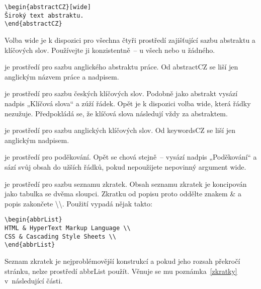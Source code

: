 \documentclass[FM,BP]{tulthesis}
\newcommand{\argument}[1]{{\ttfamily\color{\tulcolor}#1}}
\newcommand{\argumentindex}[1]{\argument{#1}\index{#1}}
\newcommand{\prostredi}[1]{\argumentindex{#1}}
\newenvironment{myquote}{\begin{list}{}{\setlength\leftmargin\parindent}\item[]}{\end{list}}
\newenvironment{listing}{\begin{myquote}\color{\tulcolor}}{\end{myquote}}
\begin{document}
\begin{description}
\begin{listing}
\begin{verbatim}
\begin{abstractCZ}[wide]
Široký text abstraktu.
\end{abstractCZ}
\end{verbatim}
\end{listing}

Volba \argument{wide} je k dispozici pro všechna čtyři prostředí zajišťující
sazbu abstraktu a klíčových slov. Používejte ji konzistentně~-- u všech nebo u
žádného.

\item[\prostredi{abstractEN}] je prostředí pro sazbu anglického abstraktu práce.
Od \argument{abstractCZ} se liší jen anglickým názvem práce a nadpisem.

\item[\prostredi{keywordsCZ}] je prostředí pro sazbu českých klíčových slov.
Podobně jako abstrakt vysází nadpis „Klíčová slova“ a zúží řádek. Opět je k
dispozici volba \argument{wide}, která řádky nezužuje. Předpokládá se, že
klíčová slova následují vždy za abstraktem.

\item[\prostredi{keywordsEN}] je prostředí pro sazbu anglických klíčových slov.
Od \argument{keywordsCZ} se liší jen anglickým nadpisem.

\item[\prostredi{acknowledgement}] je prostředí pro poděkování. Opět se chová
stejně~-- vysází nadpis „Poděkování“ a sází svůj obsah do užších řádků, pokud
nepoužijete nepovinný argument \argument{wide}.

\item[\prostredi{abbrList}] je prostředí pro sazbu seznamu zkratek. Obsah
seznamu zkratek je koncipován jako tabulka se dvěma sloupci. Zkratku od popisu
proto oddělte znakem \argument{\&} a popis zakončete
\argument{\textbackslash\textbackslash}. Použití vypadá nějak takto:

{\color{\tulcolor}
\begin{verbatim}
\begin{abbrList}
HTML & HyperText Markup Language \\
CSS & Cascading Style Sheets \\
\end{abbrList}
\end{verbatim}}

Seznam zkratek je nejproblémovější konstrukcí a pokud jeho rozsah překročí
stránku, nelze prostředí \argument{abbrList} použít. Věnuje se mu
poznámka~\ref{zkratky} v~následující části.

\end{description}
\end{document}
